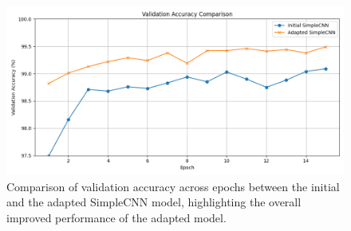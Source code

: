 
  \begin{figure} [ht]
    \centering
    \includegraphics[width=.9\textwidth]{figures/simpleCNN_old_vs_new.png}
    \caption{Comparison of validation accuracy across epochs between the initial and the adapted SimpleCNN model, highlighting the overall improved performance of the adapted model.}\label{fig:SimpleCNN_old_new}
\end{figure}
